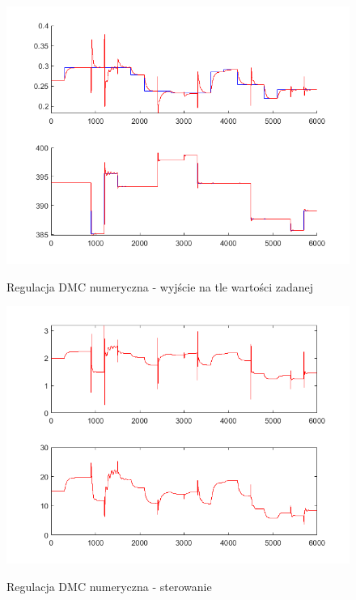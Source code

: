 \begin{figure}[h!]
	\centering
	\includegraphics[width=.6\linewidth]{img/yDMCnum.png}
	\label{ch2:regulator}
	\caption{Regulacja DMC numeryczna - wyjście na tle wartości zadanej}
\end{figure}

\begin{figure}[h!]
	\centering
	\includegraphics[width=.6\linewidth]{img/uDMCnum.png}
	\label{ch2:regulator}
	\caption{Regulacja DMC numeryczna - sterowanie}
\end{figure}
